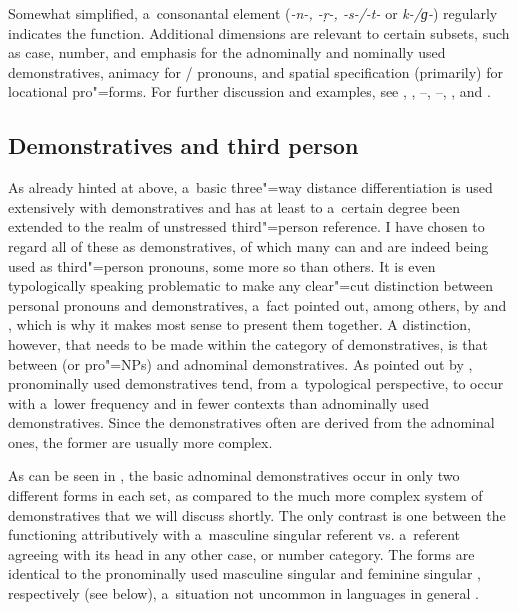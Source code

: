 Somewhat simplified, a~consonantal element (\textit{-n-, -ṛ-, -s-/-t-} or \textit{k-/ɡ-}) regularly indicates the  function. Additional dimensions are relevant to certain subsets, such as case, number,  and emphasis for the adnominally and nominally used demonstratives, animacy for / pronouns, and spatial specification (primarily) for locational pro"=forms. For further discussion and examples, see , , --, --, ,  and .

\subsection{Demonstratives and third person}
\label{subsec:5-2-2}


As already hinted at above, a~basic three"=way distance differentiation is used extensively with demonstratives and has at least to a~certain degree been extended to the realm of unstressed third"=person reference. I have chosen to regard all of these as demonstratives, of which many can and are indeed being used as third"=person pronouns, some more so than others. It is even typologically speaking problematic to make any clear"=cut distinction between personal pronouns and demonstratives, a~fact pointed out, among others, by \citet[206]{himmelmann1996} and \citet[123--124]{kibrik2011}, which is why it makes most sense to present them together. A distinction, however, that needs to be made within the category of demonstratives, is that between  (or pro"=NPs) and adnominal demonstratives. As pointed out by \citet[206]{himmelmann1996}, pronominally used demonstratives tend, from a~typological perspective, to occur with a~lower frequency and in fewer contexts than adnominally used demonstratives. Since the  demonstratives often are derived from the adnominal ones, the former are usually more complex. 



As can be seen in , the basic adnominal demonstratives occur in only two different forms in each  set, as compared to the much more complex system of  demonstratives that we will discuss shortly. The only contrast is one between the  functioning attributively with a~masculine singular  referent vs. a~referent agreeing with its head in any other case,  or number category. The forms are identical to the pronominally used masculine singular  and feminine singular , respectively (see below), a~situation not uncommon in languages in general \citep[214]{himmelmann1996}. 


